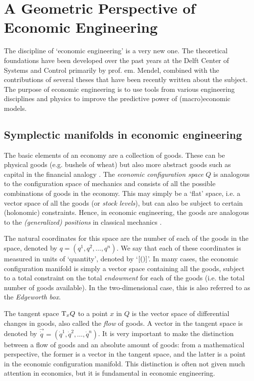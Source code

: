 \chapter{A Geometric Perspective of Economic Engineering}
\label{chap:symplectic_economics}

The discipline of `economic engineering' is a very new one. The theoretical foundations have been developed over the past years at the Delft Center of Systems and Control primarily by prof. em. Mendel, combined with the contributions of several theses that have been recently written about the subject. The purpose of economic engineering is to use tools from various engineering disciplines and physics to improve the predictive power of (macro)economic models.

\section{Symplectic manifolds in economic engineering}
The basic elements of an economy are a collection of goods. These can be physical goods (e.g. bushels of wheat) but also more abstract goods such as capital in the financial analogy \cite{Kruimer2021}. The \emph{economic configuration space} \(Q\) is analogous to the configuration space of mechanics and consists of all the possible combinations of goods in the economy. This may simply be a `flat' space, i.e. a vector space of all the goods (or \emph{stock levels}), but can also be subject to certain (holonomic) constraints. Hence, in economic engineering, the goods are analogous to the \emph{(generalized) positions} in classical mechanics \cite{Mendel2019}. 

The natural coordinates for this space are the number of each of the goods in the space, denoted by \(q = (q^1, q^2, \ldots, q^n)\). We say that each of these coordinates is measured in units of `quantity', denoted by `\(\qty[\si{\quantity}]\)'. In many cases, the economic configuration manifold is simply a vector space containing all the goods, subject to a total constraint on the total \emph{endowment} for each of the goods (i.e. the total number of goods available). In the two-dimensional case, this is also referred to as the \emph{Edgeworth box}.

The tangent space \(\mathrm{T}_{x} Q\) to a point \(x\) in \(Q\) is the vector space of differential changes in goods, also called the \emph{flow} of goods. A vector in the tangent space is denoted by \(\vec{\dot{q}} = (\dot{q}^1, \dot{q}^2, \ldots, \dot{q}^n)\). It is very important to make the distinction between a flow of goods and an absolute amount of goods: from a mathematical perspective, the former is a vector in the tangent space, and the latter is a point in the economic configuration manifold. This distinction is often not given much attention in economics, but it is fundamental in economic engineering.

